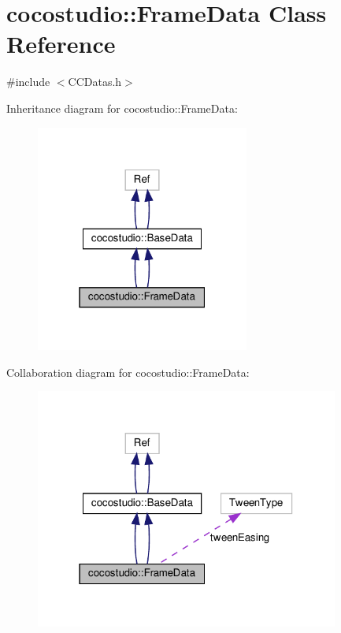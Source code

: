 \hypertarget{classcocostudio_1_1FrameData}{}\section{cocostudio\+:\+:Frame\+Data Class Reference}
\label{classcocostudio_1_1FrameData}


{\ttfamily \#include $<$C\+C\+Datas.\+h$>$}



Inheritance diagram for cocostudio\+:\+:Frame\+Data\+:
\nopagebreak
\begin{figure}[H]
\begin{center}
\leavevmode
\includegraphics[width=199pt]{classcocostudio_1_1FrameData__inherit__graph}
\end{center}
\end{figure}


Collaboration diagram for cocostudio\+:\+:Frame\+Data\+:
\nopagebreak
\begin{figure}[H]
\begin{center}
\leavevmode
\includegraphics[width=283pt]{classcocostudio_1_1FrameData__coll__graph}
\end{center}
\end{figure}
